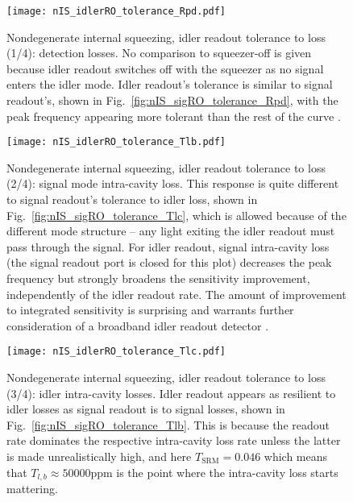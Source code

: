 \begin{figure}
    \centering
    \texttt{[image: nIS\_idlerRO\_tolerance\_Rpd.pdf]} 
    \caption{   Nondegenerate internal squeezing, idler readout tolerance to loss (1/4): detection losses. No comparison to squeezer-off is given because idler readout switches off with the squeezer as no signal enters the idler mode. Idler readout's tolerance is similar to signal readout's, shown in Fig.~\ref{fig:nIS_sigRO_tolerance_Rpd}, with the peak frequency appearing more tolerant than the rest of the curve . }
    \label{fig:nIS_idlerRO_tolerance_Rpd}
\end{figure}
\begin{figure}
	\centering
	\texttt{[image: nIS\_idlerRO\_tolerance\_Tlb.pdf]}
	\caption{ Nondegenerate internal squeezing, idler readout tolerance to loss (2/4): signal mode intra-cavity loss. This response is quite different to signal readout's tolerance to idler loss, shown in Fig.~\ref{fig:nIS_sigRO_tolerance_Tlc}, which is allowed because of the different mode structure -- any light exiting the idler readout must pass through the signal. For idler readout, signal intra-cavity loss (the signal readout port is closed for this plot) decreases the peak frequency but strongly broadens the sensitivity improvement, independently of the idler readout rate. The amount of improvement to integrated sensitivity is surprising  and warrants further consideration of a broadband idler readout detector .}
	\label{fig:nIS_idlerRO_tolerance_Tlb}
\end{figure}
\begin{figure}
	\centering
	\texttt{[image: nIS\_idlerRO\_tolerance\_Tlc.pdf]}
	\caption{  Nondegenerate internal squeezing, idler readout tolerance to loss (3/4): idler intra-cavity losses. Idler readout appears as resilient to idler losses as signal readout is to signal losses, shown in Fig.~\ref{fig:nIS_sigRO_tolerance_Tlb}. This is because the readout rate dominates the respective intra-cavity loss rate unless the latter is made unrealistically high, and here $T_\text{SRM}=0.046$ which means that $T_{l,b}\approx50000\text{ppm}$ is the point where the intra-cavity loss starts mattering.}
	\label{fig:nIS_idlerRO_tolerance_Tlc}
\end{figure}
